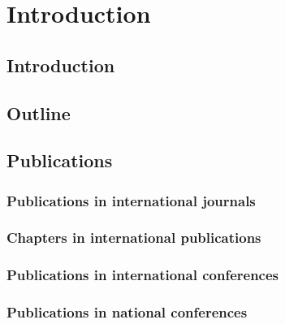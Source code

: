 \graphicspath{{chapt_dutch/}{intro/}{chapt2/}{chapt3/}{chapt4/}}

\renewcommand\evenpagerightmark{{\scshape\small Introduction}}
\renewcommand\oddpageleftmark{{\scshape\small Introduction}}

\renewcommand{\bibname}{References}

\hyphenation{}

\chapter[Introduction]%
{Introduction}

\section{Introduction}

\section{Outline}

\section{Publications}
\subsection{Publications in international journals}

\subsection{Chapters in international publications}

\subsection{Publications in international conferences}

\subsection{Publications in national conferences}

\clearpage




\clearpage{\pagestyle{empty}\cleardoublepage}
